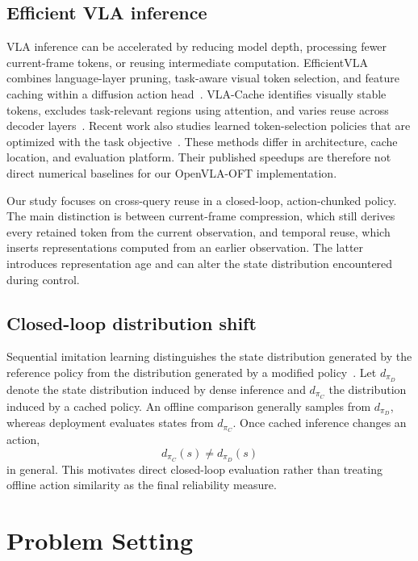 \documentclass[journal]{IEEEtran}
\begin{document}
\subsection{Efficient VLA inference}
VLA inference can be accelerated by reducing model depth, processing fewer current-frame tokens, or reusing intermediate computation. EfficientVLA combines language-layer pruning, task-aware visual token selection, and feature caching within a diffusion action head~\cite{yang2025efficientvla}. VLA-Cache identifies visually stable tokens, excludes task-relevant regions using attention, and varies reuse across decoder layers~\cite{xu2025vlacache}. Recent work also studies learned token-selection policies that are optimized with the task objective~\cite{wei2026learnedcache}. These methods differ in architecture, cache location, and evaluation platform. Their published speedups are therefore not direct numerical baselines for our OpenVLA-OFT implementation.

Our study focuses on cross-query reuse in a closed-loop, action-chunked policy. The main distinction is between current-frame compression, which still derives every retained token from the current observation, and temporal reuse, which inserts representations computed from an earlier observation. The latter introduces representation age and can alter the state distribution encountered during control.

\subsection{Closed-loop distribution shift}
Sequential imitation learning distinguishes the state distribution generated by the reference policy from the distribution generated by a modified policy~\cite{ross2011dagger}. Let $d_{\pi_D}$ denote the state distribution induced by dense inference and $d_{\pi_C}$ the distribution induced by a cached policy. An offline comparison generally samples from $d_{\pi_D}$, whereas deployment evaluates states from $d_{\pi_C}$. Once cached inference changes an action,
\begin{equation}
    d_{\pi_C}(s) \neq d_{\pi_D}(s)
    \label{eq:shift}
\end{equation}
in general. This motivates direct closed-loop evaluation rather than treating offline action similarity as the final reliability measure.

\section{Problem Setting}
\end{document}
